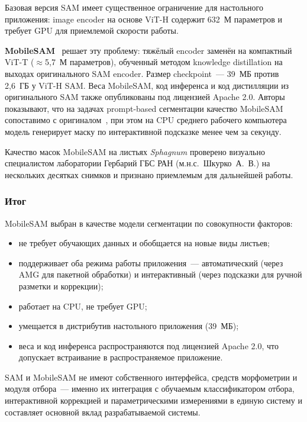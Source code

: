 Базовая версия SAM имеет существенное ограничение для настольного приложения:
image encoder на основе ViT-H содержит 632~М параметров и требует GPU для приемлемой
скорости работы.

\textbf{MobileSAM}~\cite{Zhang2023} решает эту проблему: тяжёлый encoder заменён на
компактный ViT-T ($\approx$5{,}7~М параметров), обученный методом knowledge distillation
на выходах оригинального SAM encoder. Размер checkpoint~--- 39~МБ против 2,6~ГБ у ViT-H
SAM. Веса MobileSAM, код инференса и код дистилляции из оригинального SAM также опубликованы
под лицензией Apache 2.0.
Авторы показывают, что на задачах prompt-based сегментации качество MobileSAM сопоставимо
с оригиналом~\cite{Zhang2023}, при этом на CPU среднего рабочего компьютера модель
генерирует маску по интерактивной подсказке менее чем за секунду.

Качество масок MobileSAM на листьях \textit{Sphagnum} проверено визуально специалистом
лаборатории Гербарий ГБС РАН (м.н.с.\ Шкурко~А.~В.) на нескольких десятках снимков и
признано приемлемым для дальнейшей работы.

\subsubsection*{Итог}

MobileSAM выбран в качестве модели сегментации по совокупности факторов:
\begin{itemize}
    \item не требует обучающих данных и обобщается на новые виды листьев;
    \item поддерживает оба режима работы приложения~--- автоматический (через AMG для
          пакетной обработки) и интерактивный (через подсказки для ручной разметки и
          коррекции);
    \item работает на CPU, не требует GPU;
    \item умещается в дистрибутив настольного приложения (39~МБ);
    \item веса и код инференса распространяются под лицензией Apache 2.0, что допускает
          встраивание в распространяемое приложение.
\end{itemize}
SAM и MobileSAM не имеют собственного интерфейса, средств морфометрии и модуля отбора~---
именно их интеграция с обучаемым классификатором отбора, интерактивной коррекцией и
параметрическими измерениями в единую систему и составляет основной вклад
разрабатываемой системы.

